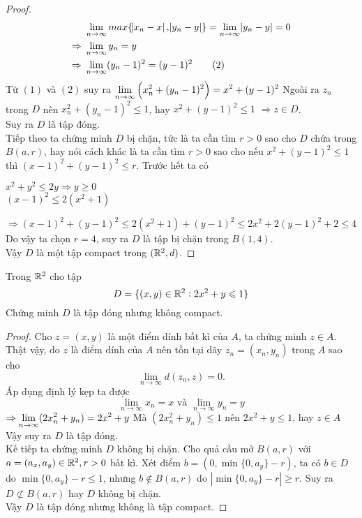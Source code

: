 \begin{proof}
\begin{align*}
        &\ \lim_{n\to\infty}max\{\abs{x_n - x},\abs{y_n - y}\} =\lim_{n\to\infty} \abs{y_n - y} = 0\\
        \Rightarrow&\ \lim_{n\to\infty} y_n = y\\
        \Rightarrow&\ \lim_{n\to\infty} (y_n-1)^2 = (y-1)^2 \tag{2}
    \end{align*}
    Từ $(1)$ và $(2)$ suy ra $\displaystyle\lim_{n\to\infty} \left(x_n^2 + (y_n-1)^2\right) = x^2 +(y-1)^2$\nl
    Ngoài ra $z_n$ trong $D$ nên $x_n^2 + (y_n-1)^2 \leq 1$, hay $x^2 +(y-1)^2 \leq 1$\nl
    $\Rightarrow z \in D$.\\
    Suy ra $D$ là tập đóng.\\[3mm]
    Tiếp theo ta chứng minh $D$ bị chặn, tức là ta cần tìm $r > 0$ sao cho $D$ chứa trong $B(a,r)$, hay nói cách khác là ta cần tìm $r>0$ sao cho nếu $x^2 + (y-1)^2 \leq 1$ thì $(x-1)^2 + (y-1)^2 \leq r$. Trước hết ta có
    \begin{center}
        $x^2 + y^2 \leq 2y \Rightarrow y \geq 0$\\
        $(x-1)^2 \leq 2(x^2+1)$
    \end{center}
    $\Rightarrow (x-1)^2 + (y-1)^2 \leq 2(x^2+1) + (y-1)^2 \leq 2x^2 + 2(y-1)^2 +2 \leq 4$\\
    Do vậy ta chọn $r=4$, suy ra $D$ là tập bị chặn trong $B(1,4)$.\\
    Vậy $D$ là một tập compact trong $(\mathbb R^2,d)$.
\end{proof}

\begin{exercise}{23} Trong $\mathbb R^2$ cho tập
    $$
        D = \{(x,y) \in \mathbb R^2 : 2x^2 + y \leqslant 1\}
    $$
    Chứng minh $D$ là tập đóng nhưng không compact.
\end{exercise}

\begin{proof}
Cho $z = (x,y)$ là một điểm dính bất kì của $A$, ta chứng minh $z \in A$. Thật vậy, do $z$ là điểm dính của $A$ nên tồn tại dãy $z_n = (x_n, y_n)$ trong $A$ sao cho
$$
    \lim_{n \to \infty} d(z_n,z) = 0.
$$
Áp dụng định lý kẹp ta được\\
$$
    \lim_{n \to \infty} x_n = x \text{ và } \lim_{n \to \infty} y_n = y
$$
$\Rightarrow \displaystyle\lim_{n \to \infty} (2x_n^2 + y_n) = 2x^2 + y$\nl
Mà $(2x_n^2 + y_n) \leq 1$ nên $2x^2 + y \leq 1$, hay $z\in A$\\
Vậy suy ra $D$ là tập đóng.\\[3mm]
Kế tiếp ta chứng minh $D$ không bị chặn. Cho quả cầu mở $B(a,r)$ với $a = (a_x, a_y) \in \mathbb R^2, r > 0$ bất kì. Xét điểm $b = (0, \min\{0, a_y\}-r)$, ta có $b \in D$ do $\min\{0, a_y\} - r \leq 1$, nhưng $b \notin B(a,r)$ do $|\min\{0, a_y\} - r| \geq r$. Suy ra $D \not\subset B(a,r)$ hay $D$ không bị chặn.\\
Vậy $D$ là tập đóng nhưng không là tập compact.
\end{proof}


